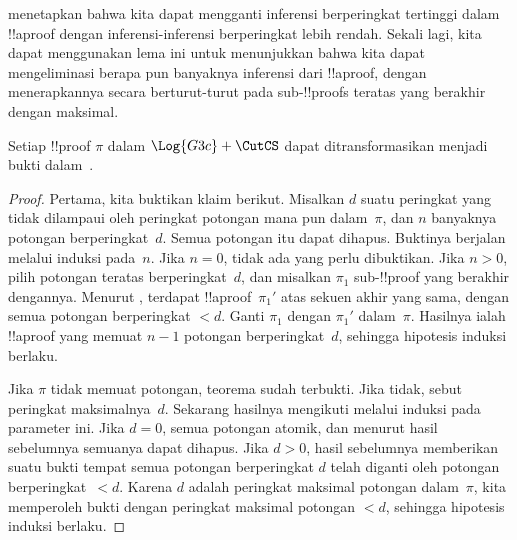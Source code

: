 \documentclass[../../../include/open-logic-section]{subfiles}
\begin{document}
 menetapkan bahwa kita dapat mengganti inferensi
\CutCS{} berperingkat tertinggi dalam !!a{proof} dengan inferensi-inferensi
\CutCS{} berperingkat lebih rendah. Sekali lagi, kita dapat menggunakan lema
ini untuk menunjukkan bahwa kita dapat mengeliminasi berapa pun banyaknya
inferensi \CutCS{} dari !!a{proof}, dengan menerapkannya secara berturut-turut
pada sub-!!{proof}s teratas yang berakhir dengan \CutCS{} maksimal.

\begin{thm}
Setiap !!{proof} $\pi$ dalam $\Log{G3c} + \CutCS$ dapat ditransformasikan
menjadi bukti dalam~.
\end{thm}

\begin{proof}
  Pertama, kita buktikan klaim berikut. Misalkan $d$ suatu peringkat yang
  tidak dilampaui oleh peringkat potongan mana pun dalam~$\pi$, dan $n$ banyaknya
  potongan berperingkat~$d$. Semua potongan itu dapat dihapus. Buktinya
  berjalan melalui induksi pada~$n$. Jika $n=0$, tidak ada yang perlu
  dibuktikan. Jika $n>0$, pilih potongan teratas berperingkat~$d$, dan
  misalkan $\pi_1$ sub-!!{proof} yang berakhir dengannya. Menurut
  , terdapat !!a{proof}~$\pi_1'$ atas sekuen akhir
  yang sama, dengan semua potongan berperingkat $<d$. Ganti $\pi_1$ dengan
  $\pi_1'$ dalam~$\pi$. Hasilnya ialah !!a{proof} yang memuat $n-1$
  potongan berperingkat~$d$, sehingga hipotesis induksi berlaku.

  Jika $\pi$ tidak memuat potongan, teorema sudah terbukti. Jika
  tidak, sebut peringkat maksimalnya~$d$. Sekarang hasilnya mengikuti
  melalui induksi pada parameter ini. Jika $d=0$, semua
  potongan atomik, dan menurut hasil sebelumnya semuanya dapat dihapus. Jika
  $d>0$, hasil sebelumnya memberikan suatu bukti tempat semua potongan
  berperingkat $d$ telah diganti oleh potongan berperingkat~$<d$. Karena $d$
  adalah peringkat maksimal potongan dalam~$\pi$, kita memperoleh bukti
  dengan peringkat maksimal potongan $<d$, sehingga hipotesis induksi
  berlaku.
\end{proof}
\end{document}
